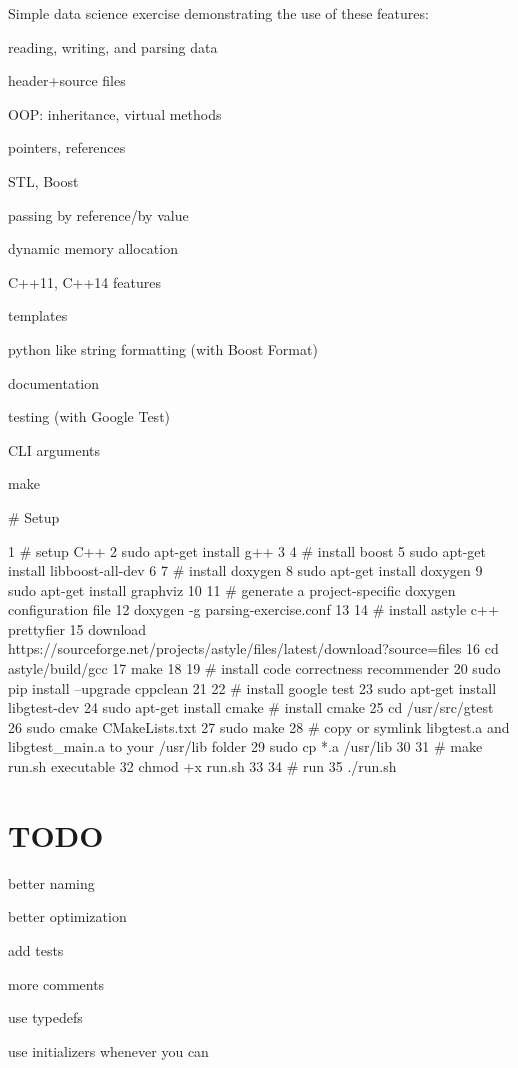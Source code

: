 Simple data science exercise demonstrating the use of these features\+:


\begin{DoxyItemize}
\item reading, writing, and parsing data
\item header+source files
\item O\+OP\+: inheritance, virtual methods
\item pointers, references
\item S\+TL, Boost
\item passing by reference/by value
\item dynamic memory allocation
\item C++11, C++14 features
\item templates
\item python like string formatting (with Boost Format)
\item documentation
\item testing (with Google Test)
\item C\+LI arguments
\item make
\end{DoxyItemize}

\# Setup 
\begin{DoxyCode}
1 # setup C++
2 sudo apt-get install g++
3 
4 # install boost
5 sudo apt-get install libboost-all-dev
6 
7 # install doxygen
8 sudo apt-get install doxygen
9 sudo apt-get install graphviz
10 
11 # generate a project-specific doxygen configuration file
12 doxygen -g parsing-exercise.conf
13 
14 # install astyle c++ prettyfier
15 download https://sourceforge.net/projects/astyle/files/latest/download?source=files
16 cd astyle/build/gcc
17 make
18 
19 # install code correctness recommender
20 sudo pip install --upgrade cppclean
21 
22 # install google test
23 sudo apt-get install libgtest-dev
24 sudo apt-get install cmake # install cmake
25 cd /usr/src/gtest
26 sudo cmake CMakeLists.txt
27 sudo make
28 # copy or symlink libgtest.a and libgtest\_main.a to your /usr/lib folder
29 sudo cp *.a /usr/lib
30 
31 # make run.sh executable
32 chmod +x run.sh
33 
34 # run
35 ./run.sh
\end{DoxyCode}


\section*{T\+O\+DO}


\begin{DoxyItemize}
\item better naming
\item better optimization
\item add tests
\item more comments
\item use typedefs
\item use initializers whenever you can 
\end{DoxyItemize}
